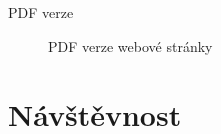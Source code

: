 \documentclass[14pt, hyperref={unicode}]{beamer}
\begin{document}
  \begin{frame}{PDF verze}
    \begin{figure}[H]
      \caption{PDF verze webové stránky}
    \end{figure}
  \end{frame}

  \section{Návštěvnost}
\end{document}
